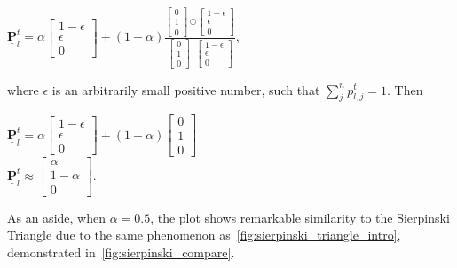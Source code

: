 \begin{center}
$\underline{\mathbf{P}}^t_l = \alpha \begin{bmatrix}
    1-\epsilon\\
    \epsilon\\
    0
\end{bmatrix} + (1 - \alpha) \frac{\begin{bmatrix} 0\\1\\0 \end{bmatrix} \odot \begin{bmatrix} 1-\epsilon\\ \epsilon\\ 0 \end{bmatrix}} {\begin{bmatrix} 0\\1\\0 \end{bmatrix} \cdot \begin{bmatrix} 1- \epsilon\\ \epsilon \\ 0\end{bmatrix}} $, \\
\end{center}
where $\epsilon$ is an arbitrarily small positive number, such that $\sum^n_j p^t_{l,j} = 1$. Then 
\begin{center}
$\underline{\mathbf{P}}^t_l =\alpha \begin{bmatrix}
    1 - \epsilon \\
    \epsilon\\
    0
\end{bmatrix} + (1 - \alpha) \begin{bmatrix} 0\\ 1 \\ 0  \end{bmatrix} $ \\

$\underline{\mathbf{P}}^t_l \approx \begin{bmatrix} \alpha \\ 1 - \alpha \\ 0  \end{bmatrix}$.
\end{center}

As an aside, when $\alpha = 0.5$, the plot shows remarkable similarity to the Sierpinski Triangle due to the same phenomenon as~\cref{fig:sierpinski_triangle_intro}, demonstrated in~\cref{fig:sierpinski_compare}. 

